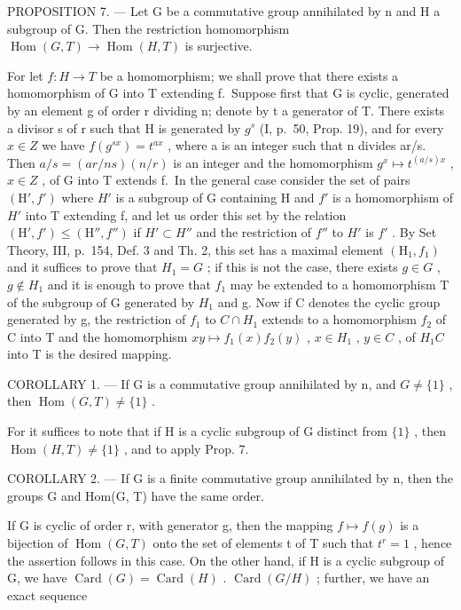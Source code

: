 PROPOSITION 7. --- Let G be a commutative group annihilated by n and H a subgroup of G. Then the restriction homomorphism \(\operatorname{Hom}(G, T) \to \operatorname{Hom}(H, T)\) is surjective.

For let \(f:H\to T\) be a homomorphism; we shall prove that there exists a homomorphism of G into T extending f.~Suppose first that G is cyclic, generated by an element g of order r dividing n; denote by t a generator of T. There exists a divisor s of r such that H is generated by \(g^{s}\) (I, p.~50, Prop. 19), and for every \(x \in Z\) we have \(f(g^{sx}) = t^{ax}\) , where a is an integer such that n divides ar/s. Then \(a/s = (ar/ns)(n/r)\) is an integer and the homomorphism \(g^{x} \mapsto t^{(a/s)x}\) , \(x \in Z\) , of G into T extends f.~In the general case consider the set of pairs \((\mathrm{H}', f')\) where \(H'\) is a subgroup of G containing H and \(f'\) is a homomorphism of \(H'\) into T extending f, and let us order this set by the relation \((\mathrm{H}', f') \leqslant (\mathrm{H}'', f'')\) if \(H' \subset H''\) and the restriction of \(f''\) to \(H'\) is \(f'\) . By Set Theory, III, p.~154, Def. 3 and Th. 2, this set has a maximal element \((\mathrm{H}_{1}, f_{1})\) and it suffices to prove that \(H_{1} = G\) ; if this is not the case, there exists \(g \in G\) , \(g \notin H_{1}\) and it is enough to prove that \(f_{1}\) may be extended to a homomorphism T of the subgroup of G generated by \(H_{1}\) and g. Now if C denotes the cyclic group generated by g, the restriction of \(f_{1}\) to \(C \cap H_{1}\) extends to a homomorphism \(f_{2}\) of C into T and the homomorphism \(xy \mapsto f_{1}(x) f_{2}(y)\) , \(x \in H_{1}\) , \(y \in C\) , of \(H_{1}C\) into T is the desired mapping.

COROLLARY 1. --- If G is a commutative group annihilated by n, and \(G \neq \{1\}\) , then \(\operatorname{Hom}(G, T) \neq \{1\}\) .

For it suffices to note that if H is a cyclic subgroup of G distinct from \(\{1\}\) , then \(\operatorname{Hom}(H, T) \neq \{1\}\) , and to apply Prop. 7.

COROLLARY 2. --- If G is a finite commutative group annihilated by n, then the groups G and Hom(G, T) have the same order.

If G is cyclic of order r, with generator g, then the mapping \(f \mapsto f(g)\) is a bijection of \(\operatorname{Hom}(G, T)\) onto the set of elements t of T such that \(t^{r} = 1\) , hence the assertion follows in this case. On the other hand, if H is a cyclic subgroup of G, we have \(\operatorname{Card}(G) = \operatorname{Card}(H)\) . \(\operatorname{Card}(G/H)\) ; further, we have an exact sequence


